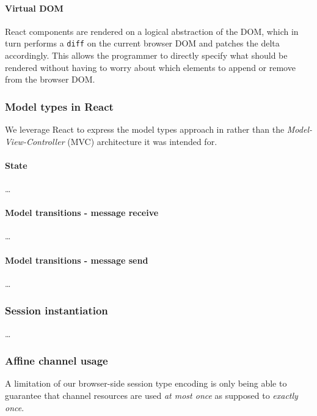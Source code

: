 \documentclass[submission,copyright,creativecommons]{eptcs}
\begin{document}
\paragraph{Virtual DOM} React components are rendered on a logical abstraction of the DOM, which in turn performs a \texttt{diff} on the current browser DOM and patches the delta accordingly. This allows the programmer to directly specify what should be rendered without having to worry about which elements to append or remove from the browser DOM.


\subsubsection{Model types in React}
We leverage React to express the model types approach in \cite{MVU2019} rather than the \textit{Model-View-Controller} (MVC) architecture it was intended for. 

\paragraph{State} \dots

\paragraph{Model transitions - message receive} \dots

\paragraph{Model transitions - message send} \dots

\subsubsection{Session instantiation}

\dots


\subsubsection{Affine channel usage}
A limitation of our browser-side session type encoding is only being able to guarantee that channel resources are used \textit{at most once} as supposed to \textit{exactly once}.
\end{document}
